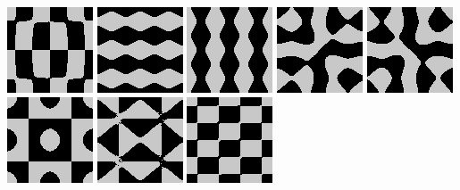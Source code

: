 \includegraphics{o/chladni_033.png}
\includegraphics{o/chladni_034.png}
\includegraphics{o/chladni_035.png}
\includegraphics{o/chladni_036.png}
\includegraphics{o/chladni_037.png}
\includegraphics{o/chladni_038.png}
\includegraphics{o/chladni_039.png}
\includegraphics{o/chladni_040.png}

